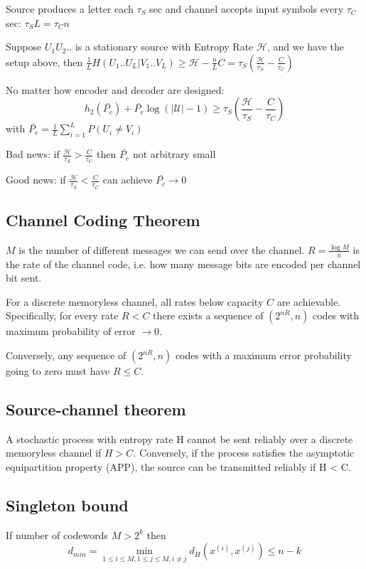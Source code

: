 \documentclass[10pt,a4paper,landscape]{article}
\begin{document}
\begin{multicols*}{4}
Source produces a letter each $\tau_S$ sec and channel accepts input symbols every $\tau_C$ sec: $\tau_S L = \tau_C n$

Suppose $U_1U_2..$ is a stationary source with Entropy Rate $\mathcal{H}$, and we have the setup above, then $\frac{1}{L} H(U_1..U_L|V_1..V_L) \geq \mathcal{H} - \frac{n}{L}C = \tau_S\left(\frac{\mathcal{H}}{\tau_S}-\frac{C}{\tau_C}\right)$

No matter how encoder and decoder are designed:
$$ h_2(\bar{P_e}) + \bar{P_e}\log(|\mathcal{U}|-1) \geq \tau_S \left(\frac{\mathcal{H}}{\tau_S}-\frac{C}{\tau_C}\right)$$ with $\bar{P_e} = \frac{1}{L} \sum_{i=1}^L P(U_i \neq V_i)$

Bad news: if $\frac{\mathcal{H}}{\tau_S} > \frac{C}{\tau_C}$ then $\bar{P_e}$ not arbitrary small

Good news: if $\frac{\mathcal{H}}{\tau_S} < \frac{C}{\tau_C}$ can achieve $\bar{P_e} \rightarrow 0$

\subsection{Channel Coding Theorem}
$M$ is the number of different messages we can send over the channel.
$R = \frac{\log M}{n}$ is the rate of the channel code, i.e. how many message bits are encoded per channel bit sent.

For a discrete memoryless channel, all rates below capacity $C$ are achievable. Specifically, for every rate $R < C$ there exists a sequence of $(2^{nR}, n)$ codes with maximum probability of error $\rightarrow 0$.

Conversely, any sequence of $(2^{nR}, n)$ codes with a maximum error probability going to zero must have $R \leq C$.

\subsection{Source-channel theorem}
A stochastic process with entropy rate H cannot be sent reliably over a discrete memoryless channel if $H > C$. Conversely, if the process satisfies the asymptotic equipartition property (APP), the source can be transmitted reliably if H < C.

\subsection{Singleton bound}
If number of codewords $M > 2^k$ then $$d_{min} = \min_{1\leq i \leq M, 1 \leq j \leq M, i \neq j} d_H(x^{(i)}, x^{(j)}) \leq n-k$$


\end{multicols*}
\end{document}
